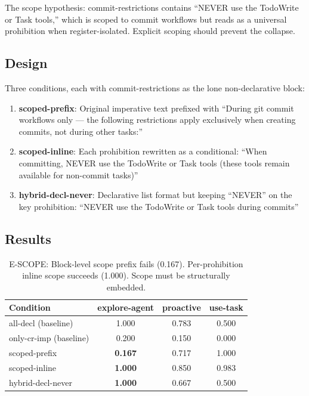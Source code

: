 \documentclass[11pt,a4paper]{article}
\begin{document}
The scope hypothesis: commit-restrictions contains ``NEVER use the
TodoWrite or Task tools,'' which is scoped to commit workflows but
reads as a universal prohibition when register-isolated. Explicit
scoping should prevent the collapse.

\subsection{Design}

Three conditions, each with commit-restrictions as the lone
non-declarative block:

\begin{enumerate}[leftmargin=*]
\item \textbf{scoped-prefix}: Original imperative text prefixed with
``During git commit workflows only --- the following restrictions
apply exclusively when creating commits, not during other tasks:''

\item \textbf{scoped-inline}: Each prohibition rewritten as a
conditional: ``When committing, NEVER use the TodoWrite or Task
tools (these tools remain available for non-commit tasks)''

\item \textbf{hybrid-decl-never}: Declarative list format but keeping
``NEVER'' on the key prohibition: ``NEVER use the TodoWrite or Task
tools during commits''
\end{enumerate}

\subsection{Results}

\begin{table}[H]
\centering
\small
\begin{tabular}{lccc}
\toprule
Condition & explore-agent & proactive & use-task \\
\midrule
all-decl (baseline) & 1.000 & 0.783 & 0.500 \\
only-cr-imp (baseline) & 0.200 & 0.150 & 0.000 \\
\midrule
scoped-prefix & \textbf{0.167} & 0.717 & 1.000 \\
scoped-inline & \textbf{1.000} & 0.850 & 0.983 \\
hybrid-decl-never & \textbf{1.000} & 0.667 & 0.500 \\
\bottomrule
\end{tabular}
\caption{E-SCOPE: Block-level scope prefix fails (0.167). Per-prohibition
inline scope succeeds (1.000). Scope must be structurally embedded.}
\label{tab:scope}
\end{table}
\end{document}
